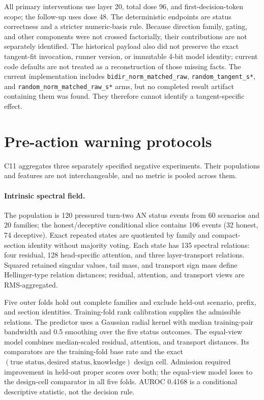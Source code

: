 All primary interventions use layer 20, total dose 96, and first-decision-token scope; the
follow-up uses dose 48. The deterministic endpoints are status correctness and a stricter
numeric-basis rule. Because direction family, gating, and other components were not crossed
factorially, their contributions are not separately identified. The historical payload also did
not preserve the exact tangent-fit invocation, runner version, or immutable 4-bit model identity;
current code defaults are not treated as a reconstruction of those missing facts.
The current implementation includes \texttt{bidir\_norm\_matched\_raw},
\texttt{random\_tangent\_s*}, and \texttt{random\_norm\_matched\_raw\_s*} arms, but no completed
result artifact containing them was found. They therefore cannot identify a tangent-specific
effect.

\section{Pre-action warning protocols}
\label{app:c11}

C11 aggregates three separately specified negative experiments. Their populations and features are
not interchangeable, and no metric is pooled across them.

\paragraph{Intrinsic spectral field.}
The population is 120 pressured turn-two AN status events from 60 scenarios and 20 families; the
honest/deceptive conditional slice contains 106 events (32 honest, 74 deceptive). Exact repeated
states are quotiented by family and compact-section identity without majority voting. Each state
has 135 spectral relations: four residual, 128 head-specific attention, and three layer-transport
relations. Squared retained singular values, tail mass, and transport sign mass define
Hellinger-type relation distances; residual, attention, and transport views are RMS-aggregated.

Five outer folds hold out complete families and exclude held-out scenario, prefix, and section
identities. Training-fold rank calibration supplies the admissible relations. The predictor uses a
Gaussian radial kernel with median training-pair bandwidth and 0.5 smoothing over the five status
outcomes. The equal-view model combines median-scaled residual, attention, and transport distances.
Its comparators are the training-fold base rate and the exact
$(\text{true status},\text{desired status},\text{knowledge})$ design cell. Admission required
improvement in held-out proper scores over both; the equal-view model loses to the design-cell
comparator in all five folds. AUROC 0.4168 is a conditional descriptive statistic, not the decision
rule.

